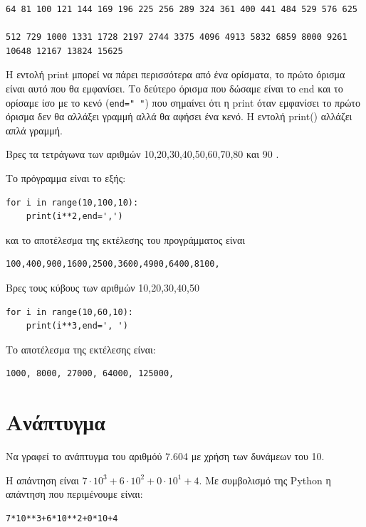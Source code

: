 \documentclass[b5paper,11pt,twoside,openleft]{memoir}
\begin{document}
\begin{lstlisting}
64 81 100 121 144 169 196 225 256 289 324 361 400 441 484 529 576 625 

512 729 1000 1331 1728 2197 2744 3375 4096 4913 5832 6859 8000 9261 
10648 12167 13824 15625
\end{lstlisting}

Η εντολή print μπορεί να πάρει περισσότερα από ένα ορίσματα, το πρώτο όρισμα είναι αυτό που θα εμφανίσει. Το δεύτερο όρισμα που δώσαμε είναι το end και το ορίσαμε ίσο με το κενό (\lstinline{end=" "}) που σημαίνει ότι η print όταν εμφανίσει το πρώτο όρισμα δεν θα αλλάξει γραμμή αλλά θα αφήσει ένα κενό. Η εντολή print() αλλάζει απλά γραμμή.
\begin{exercise}
Βρες τα τετράγωνα των αριθμών 10,20,30,40,50,60,70,80 και 90 .
\end{exercise}
Το πρόγραμμα είναι το εξής:
\begin{lstlisting}
for i in range(10,100,10):
    print(i**2,end=',')
\end{lstlisting}
και το αποτέλεσμα της εκτέλεσης του προγράμματος είναι
\begin{lstlisting}
100,400,900,1600,2500,3600,4900,6400,8100,
\end{lstlisting}

\begin{exercise}
Βρες τους κύβους των αριθμών 10,20,30,40,50
\end{exercise}

\begin{lstlisting}
for i in range(10,60,10):
    print(i**3,end=', ')  
\end{lstlisting}
Το αποτέλεσμα της εκτέλεσης είναι:
\begin{lstlisting}
1000, 8000, 27000, 64000, 125000, 
\end{lstlisting}

\section{Ανάπτυγμα}
\begin{exercise}Να γραφεί το ανάπτυγμα του αριθμόύ 7.604 με χρήση των δυνάμεων του 10.
\end{exercise}
Η απάντηση είναι $7\cdot 10^3 + 6\cdot 10^2 + 0\cdot 10^1 + 4$.  Με συμβολισμό της Python η απάντηση που περιμένουμε είναι:
\begin{lstlisting}
7*10**3+6*10**2+0*10+4
\end{lstlisting}
\end{document}
